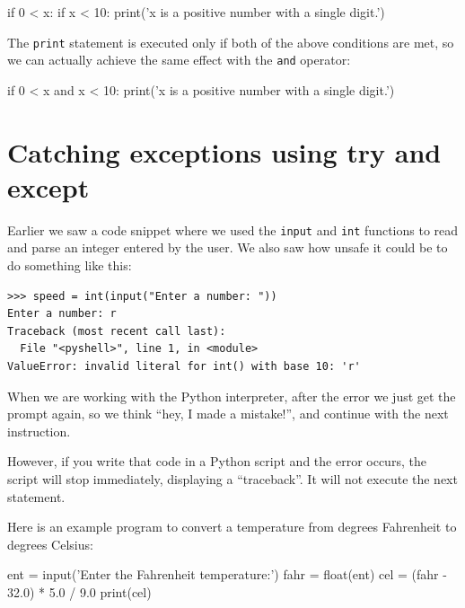 \begin{python}[frame=single]
if 0 < x:
    if x < 10:
        print('x is a positive number with a single digit.')
\end{python}

The \texttt{print} statement is executed only if both of the above conditions are met, so we can actually achieve the same effect with the \texttt{and} operator:

\begin{python}[frame=single]
if 0 < x and x < 10:
    print('x is a positive number with a single digit.')
\end{python}

\hypertarget{captura-de-excepciones-usando-try-y-except}{%
\section{Catching exceptions using try and except}\label{captura-de-excepciones-usando-try-y-except}}

Earlier we saw a code snippet where we used the \texttt{input} and \texttt{int} functions to read and parse an integer entered by the user. We also saw how unsafe it could be to do something like this:

\begin{Verbatim}[frame=single]
>>> speed = int(input("Enter a number: "))
Enter a number: r
Traceback (most recent call last):
  File "<pyshell>", line 1, in <module>
ValueError: invalid literal for int() with base 10: 'r'
\end{Verbatim}

When we are working with the Python interpreter, after the error
we just get the prompt again, so we think ``hey, I made a mistake!'', and continue with the next instruction.

However, if you write that code in a Python script and the error occurs, the script will stop immediately, displaying a ``traceback''. It will not execute the next statement.


Here is an example program to convert a temperature from degrees Fahrenheit to degrees Celsius:

  

\begin{python}
ent = input('Enter the Fahrenheit temperature:')
fahr = float(ent)
cel = (fahr - 32.0) * 5.0 / 9.0
print(cel)
\end{python}

